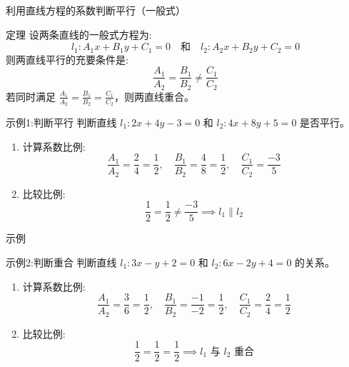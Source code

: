   \begin{frame}{利用直线方程的系数判断平行（一般式）}
    \begin{block}{定理}
      设两条直线的一般式方程为:
      \[
      l_1: A_1x + B_1y + C_1 = 0 \quad \text{和} \quad l_2: A_2x + B_2y + C_2 = 0
      \]
      则两直线平行的充要条件是:
      \[
      \frac{A_1}{A_2} = \frac{B_1}{B_2} \neq \frac{C_1}{C_2}
      \]
      若同时满足 \(\frac{A_1}{A_2} = \frac{B_1}{B_2} = \frac{C_1}{C_2}\)，则两直线重合。
    \end{block}

  \end{frame}


  \begin{frame}

    \begin{exampleblock}{示例1:判断平行}
      判断直线 \( l_1: 2x + 4y - 3 = 0 \) 和 \( l_2: 4x + 8y + 5 = 0 \) 是否平行。
      \begin{enumerate}
        \item 计算系数比例:
          \[
          \frac{A_1}{A_2} = \frac{2}{4} = \frac{1}{2}, \quad \frac{B_1}{B_2} = \frac{4}{8} = \frac{1}{2}, \quad \frac{C_1}{C_2} = \frac{-3}{5}
          \]
        \item 比较比例:
          \[
          \frac{1}{2} = \frac{1}{2} \neq \frac{-3}{5} \implies l_1 \parallel l_2
          \]
      \end{enumerate}
    \end{exampleblock}
  \end{frame}


  \begin{frame}{示例}
    \begin{exampleblock}{示例2:判断重合}
      判断直线 \( l_1: 3x - y + 2 = 0 \) 和 \( l_2: 6x - 2y + 4 = 0 \) 的关系。
      \begin{enumerate}
        \item 计算系数比例:
          \[
          \frac{A_1}{A_2} = \frac{3}{6} = \frac{1}{2}, \quad \frac{B_1}{B_2} = \frac{-1}{-2} = \frac{1}{2}, \quad \frac{C_1}{C_2} = \frac{2}{4} = \frac{1}{2}
          \]
        \item 比较比例:
          \[
          \frac{1}{2} = \frac{1}{2} = \frac{1}{2} \implies l_1 \text{ 与 } l_2 \text{ 重合}
          \]
      \end{enumerate}
    \end{exampleblock}

  \end{frame}





